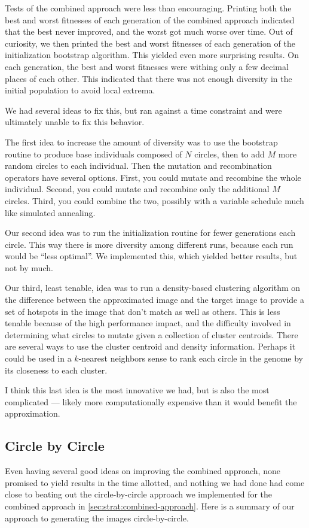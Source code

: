 \documentclass{article}
\begin{document}
Tests of the combined approach were less than encouraging. Printing both the best and worst
fitnesses of each generation of the combined approach indicated that the best never improved, and
the worst got much worse over time. Out of curiosity, we then printed the best and worst fitnesses
of each generation of the initialization bootstrap algorithm. This yielded even more surprising
results. On each generation, the best and worst fitnesses were withing only a few decimal places of
each other. This indicated that there was not enough diversity in the initial population to avoid
local extrema.

We had several ideas to fix this, but ran against a time constraint and were ultimately unable to
fix this behavior.

The first idea to increase the amount of diversity was to use the bootstrap routine to produce base
individuals composed of $N$ circles, then to add $M$ more random circles to each individual. Then
the mutation and recombination operators have several options. First, you could mutate and
recombine the whole individual. Second, you could mutate and recombine only the additional $M$
circles. Third, you could combine the two, possibly with a variable schedule much like simulated
annealing.

Our second idea was to run the initialization routine for fewer generations each circle. This way
there is more diversity among different runs, because each run would be ``less optimal''. We
implemented this, which yielded better results, but not by much.

Our third, least tenable, idea was to run a density-based clustering algorithm on the difference
between the approximated image and the target image to provide a set of hotspots in the image that
don't match as well as others. This is less tenable because of the high performance impact, and the
difficulty involved in determining what circles to mutate given a collection of cluster centroids.
There are several ways to use the cluster centroid and density information. Perhaps it could be
used in a $k$-nearest neighbors sense to rank each circle in the genome by its closeness to each
cluster.

I think this last idea is the most innovative we had, but is also the most complicated --- likely
more computationally expensive than it would benefit the approximation.

\subsection{Circle by Circle}\label{sec:strat:circle-by-circle}
Even having several good ideas on improving the combined approach, none promised to yield results
in the time allotted, and nothing we had done had come close to beating out the circle-by-circle
approach we implemented for the combined approach in \autoref{sec:strat:combined-approach}. Here is
a summary of our approach to generating the images circle-by-circle.
\end{document}
